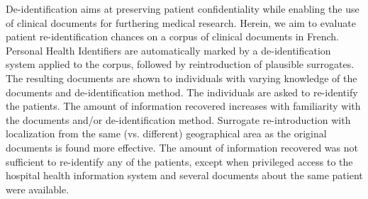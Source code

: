 De-identification aims at preserving patient confidentiality while enabling the use of clinical documents for furthering medical research. Herein, we aim to evaluate patient re-identification chances on a corpus of clinical documents in French. Personal Health Identifiers are automatically marked by a de-identification system applied to the corpus, followed by reintroduction of plausible surrogates. The resulting documents are shown to individuals with varying knowledge of the documents and de-identification method. The individuals are asked to re-identify the patients. The amount of information recovered increases with familiarity with the documents and/or de-identification method. Surrogate re-introduction with localization from the same (vs. different) geographical area as the original documents is found more effective. The amount of information recovered was not sufficient to re-identify any of the patients, except when privileged access to the hospital health information system and several documents about the same patient were available.
